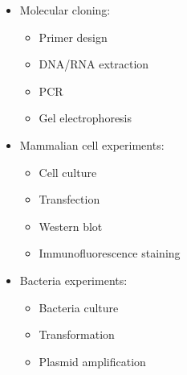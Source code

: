 \begin{multicols}{3}
    

\begin{itemize}
    \item Molecular cloning:
    \begin{itemize}
        \item Primer design
        \item DNA/RNA extraction
        \item PCR
        \item Gel electrophoresis
    \end{itemize}
\end{itemize}  
  
\columnbreak %

\begin{minipage}[t]{0.35\textwidth} %
    \begin{itemize} 
        \item Mammalian cell experiments:
        \begin{itemize}
            \item Cell culture
            \item Transfection
            \item Western blot
            \item Immunofluorescence staining
        \end{itemize}
    \end{itemize}
\end{minipage}  


\columnbreak %
  
\begin{itemize} 
    \item Bacteria experiments:
    \begin{itemize}
        \item Bacteria culture
        \item Transformation
        \item Plasmid amplification
    \end{itemize}
\end{itemize}  
\end{multicols}
